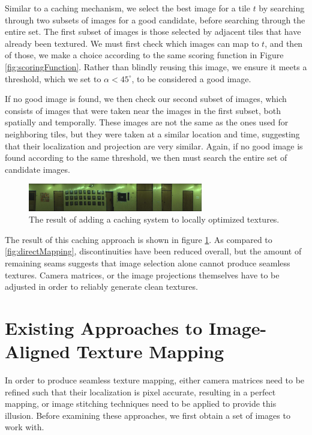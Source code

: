 \message{ !name(paper.tex)}\documentclass[10pt,twocolumn,letterpaper]{article}
\begin{document}
Similar to a caching mechanism, we select the best image for a tile
$t$ by searching through two subsets of images for a good candidate,
before searching through the entire set. The first subset of images is
those selected by adjacent tiles that have already been textured. We
must first check which images can map to $t$, and then of those, we
make a choice according to the same scoring function in Figure
\ref{fig:scoringFunction}. Rather than blindly reusing this image, we
ensure it meets a threshold, which we set to $\alpha < 45^\circ$, to
be considered a good image.

If no good image is found, we then check our second subset of images,
which consists of images that were taken near the images in the first
subset, both spatially and temporally. These images are not the same
as the ones used for neighboring tiles, but they were taken at a
similar location and time, suggesting that their localization and
projection are very similar. Again, if no good image is found
according to the same threshold, we then must search the entire set of
candidate images.

\begin{figure}
  \centering
  \includegraphics[width=3in]{wall1_cache_full.jpg}
  \caption{The result of adding a caching system to locally optimized
    textures.}
  \label{fig:caching}
\end{figure}


The result of this caching approach is shown in figure
\ref{fig:caching}. As compared to \ref{fig:directMapping},
discontinuities have been reduced overall, but the amount of remaining
seams suggests that image selection alone cannot produce seamless
textures. Camera matrices, or the image projections themselves have to
be adjusted in order to reliably generate clean textures.

\section{Existing Approaches to Image-Aligned Texture Mapping}
\label{sec:existingApproaches}
In order to produce seamless texture mapping, either camera matrices
need to be refined such that their localization is pixel accurate,
resulting in a perfect mapping, or image stitching techniques need to
be applied to provide this illusion. Before examining these
approaches, we first obtain a set of images to work with.
\end{document}
